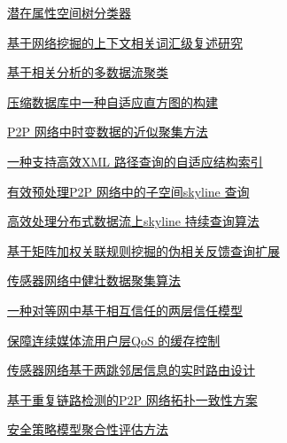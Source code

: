 \documentclass[a4paper]{article}
\begin{document}
\href{http://www.jos.org.cn/ch/reader/download_pdf.aspx?file_no=3319&year_id=2009&quarter_id=7&falg=1}{潜在属性空间树分类器}

\href{http://www.jos.org.cn/ch/reader/download_pdf.aspx?file_no=560&year_id=2009&quarter_id=7&falg=1}{基于网络挖掘的上下文相关词汇级复述研究}

\href{http://www.jos.org.cn/ch/reader/download_pdf.aspx?file_no=566&year_id=2009&quarter_id=7&falg=1}{基于相关分析的多数据流聚类}

\href{http://www.jos.org.cn/ch/reader/download_pdf.aspx?file_no=3350&year_id=2009&quarter_id=7&falg=1}{压缩数据库中一种自适应直方图的构建}

\href{http://www.jos.org.cn/ch/reader/download_pdf.aspx?file_no=3294&year_id=2009&quarter_id=7&falg=1}{P2P 网络中时变数据的近似聚集方法}

\href{http://www.jos.org.cn/ch/reader/download_pdf.aspx?file_no=3312&year_id=2009&quarter_id=7&falg=1}{一种支持高效XML 路径查询的自适应结构索引}

\href{http://www.jos.org.cn/ch/reader/download_pdf.aspx?file_no=3325&year_id=2009&quarter_id=7&falg=1}{有效预处理P2P 网络中的子空间skyline 查询}

\href{http://www.jos.org.cn/ch/reader/download_pdf.aspx?file_no=3340&year_id=2009&quarter_id=7&falg=1}{高效处理分布式数据流上skyline 持续查询算法}

\href{http://www.jos.org.cn/ch/reader/download_pdf.aspx?file_no=3368&year_id=2009&quarter_id=7&falg=1}{基于矩阵加权关联规则挖掘的伪相关反馈查询扩展}

\href{http://www.jos.org.cn/ch/reader/download_pdf.aspx?file_no=3272&year_id=2009&quarter_id=7&falg=1}{传感器网络中健壮数据聚集算法}

\href{http://www.jos.org.cn/ch/reader/download_pdf.aspx?file_no=3284&year_id=2009&quarter_id=7&falg=1}{一种对等网中基于相互信任的两层信任模型}

\href{http://www.jos.org.cn/ch/reader/download_pdf.aspx?file_no=3297&year_id=2009&quarter_id=7&falg=1}{保障连续媒体流用户层QoS 的缓存控制}

\href{http://www.jos.org.cn/ch/reader/download_pdf.aspx?file_no=3329&year_id=2009&quarter_id=7&falg=1}{传感器网络基于两跳邻居信息的实时路由设计}

\href{http://www.jos.org.cn/ch/reader/download_pdf.aspx?file_no=3307&year_id=2009&quarter_id=7&falg=1}{基于重复链路检测的P2P 网络拓扑一致性方案}

\href{http://www.jos.org.cn/ch/reader/download_pdf.aspx?file_no=3295&year_id=2009&quarter_id=7&falg=1}{安全策略模型聚合性评估方法}
\end{document}
